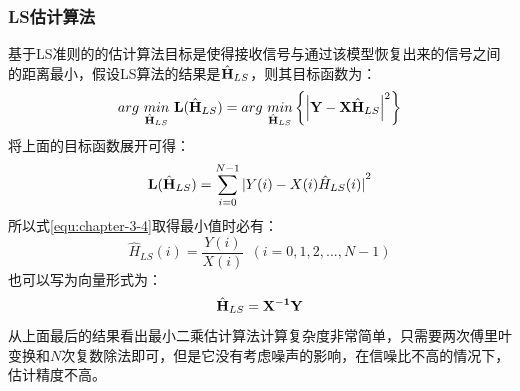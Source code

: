 \subsubsection{LS估计算法}
基于LS准则的的估计算法目标是使得接收信号与通过该模型恢复出来的信号之间的距离最小，假设LS算法的结果是${\hat{\textbf H}}_{LS}$，则其目标函数为：
\begin{equation}
arg\ \underset {{\hat{\textbf H}}_{LS}}{min}\ \textbf {L}({\hat{\textbf H}}_{LS})
=arg\ \underset {{\hat{\textbf H}}_{LS}}{min}\left \{  {\left |\textbf Y- \textbf X{\hat{\textbf H}}_{LS} \right|}^2\right \}
\label{equ:chapter-3-4}
\end{equation}
将上面的目标函数展开可得：
\begin{equation}
\textbf {L}({\hat{\textbf H}}_{LS}) = \sum_{i=0}^{N-1} {|Y(i)-X(i)\hat{H}_{LS}(i)|}^2
\end{equation}
所以式\ref{equ:chapter-3-4}取得最小值时必有：
\begin{equation}
\hat{H}_{LS}(i) = \frac{Y(i)}{X(i)} \ \ (i=0,1,2,...,N-1)
\end{equation}
也可以写为向量形式为：
\begin{equation}
{\hat{\textbf H}}_{LS} =\bf X^{-1}Y
\label{equ:Least Square channel Estimation}
\end{equation}
从上面最后的结果看出最小二乘估计算法计算复杂度非常简单，只需要两次傅里叶变换和$N$次复数除法即可，但是它没有考虑噪声的影响，在信噪比不高的情况下，估计精度不高。
